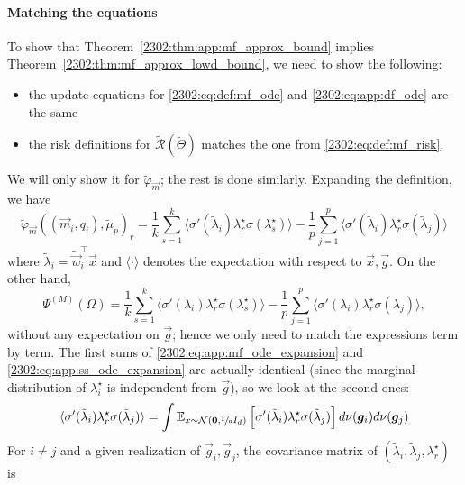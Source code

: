 \paragraph{Matching the equations} To show that Theorem~\ref{2302:thm:app:mf_approx_bound} implies Theorem~\ref{2302:thm:mf_approx_lowd_bound}, we need to show the following:
\begin{itemize}
    \item the update equations for \eqref{2302:eq:def:mf_ode} and \eqref{2302:eq:app:df_ode} are the same
    \item the risk definitions for $\tilde{\mathcal{R}}(\tilde\Theta)$ matches the one from \eqref{2302:eq:def:mf_risk}.
\end{itemize}
We will only show it for $\tilde\varphi_{\vec{m}}$; the rest is done similarly. Expanding the definition, we have
\begin{equation}\label{2302:eq:app:mf_ode_expansion}
    \tilde \varphi_{\vec{m}}((\vec{m}_i, q_i), \tilde \mu_p)_r = \frac1k \sum_{s = 1}^k \langle  \sigma'(\tilde\lambda_i) \lambda^\star_r \sigma(\lambda^\star_s) \rangle - \frac1p \sum_{j=1}^p \langle  \sigma'(\tilde\lambda_i) \lambda^\star_r \sigma(\tilde\lambda_j) \rangle
\end{equation}
where $\tilde \lambda_i = \tilde{\vec{w}}_i^\top \vec{x}$ and $\langle \cdot \rangle$ denotes the expectation with respect to $\vec{x}, \vec{g}$. On the other hand,
\begin{equation}\label{2302:eq:app:ss_ode_expansion}
    \Psi^{(M)}(\Omega) = \frac1k \sum_{s = 1}^k \langle  \sigma'(\lambda_i) \lambda^\star_r \sigma(\lambda^\star_s) \rangle - \frac1p \sum_{j=1}^p \langle  \sigma'(\lambda_i) \lambda^\star_r \sigma(\lambda_j) \rangle,
\end{equation}
without any expectation on $\vec{g}$; hence we only need to match the expressions term by term. The first sums of \eqref{2302:eq:app:mf_ode_expansion} and \eqref{2302:eq:app:ss_ode_expansion} are actually identical (since the marginal distribution of $\lambda_i^\star$ is independent from $\vec{g}$), so we look at the second ones:
\begin{equation}
    \langle  \sigma'(\tilde\lambda_i) \lambda^\star_r \sigma(\tilde\lambda_j) \rangle = \int \mathbb{E}_{x \sim \mathcal{N}({\boldsymbol{0}}, \sfrac{1}{d}I_d)}\left[ \sigma'(\tilde\lambda_i) \lambda^\star_r \sigma(\tilde\lambda_j) \right] d\nu({\boldsymbol{g}}_i) d\nu({\boldsymbol{g}}_j)
\end{equation}
For $i \neq j$ and a given realization of $\vec{g}_i, \vec{g}_j$, the covariance matrix of $(\tilde \lambda_i, \tilde \lambda_j, \lambda^\star_r)$ is
